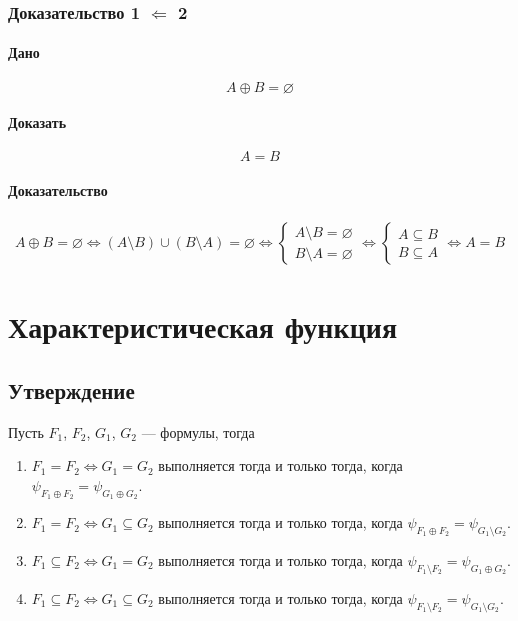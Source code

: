 \documentclass{article}
\begin{document}
\subsubsection{Доказательство 1 $\Leftarrow$ 2}
\paragraph{Дано}
\[
    A \oplus B = \varnothing
\]

\paragraph{Доказать}
\[
    A = B
\]

\paragraph{Доказательство}
\begin{gather*}
    A \oplus B = \varnothing \Leftrightarrow (A \setminus B) \cup (B \setminus A) = \varnothing \Leftrightarrow
    \begin{cases}
        A \setminus B = \varnothing \\
        B \setminus A = \varnothing
    \end{cases} \Leftrightarrow
    \begin{cases}
        A \subseteq B \\
        B \subseteq A
    \end{cases} \Leftrightarrow
    A = B
\end{gather*}



\section{Характеристическая функция}

\subsection{Утверждение}
Пусть $F_1$, $F_2$, $G_1$, $G_2$ --- формулы, тогда
\begin{enumerate}
    \item $F_1 = F_2 \Leftrightarrow G_1 = G_2$ выполняется тогда и только тогда, когда $\psi_{F_1 \oplus F_2} = \psi_{G_1 \oplus G_2}$.
    \item $F_1 = F_2 \Leftrightarrow G_1 \subseteq G_2$ выполняется тогда и только тогда, когда $\psi_{F_1 \oplus F_2} = \psi_{G_1 \setminus G_2}$.
    \item $F_1 \subseteq F_2 \Leftrightarrow G_1 = G_2$ выполняется тогда и только тогда, когда $\psi_{F_1 \setminus F_2} = \psi_{G_1 \oplus G_2}$.
    \item $F_1 \subseteq F_2 \Leftrightarrow G_1 \subseteq G_2$ выполняется тогда и только тогда, когда $\psi_{F_1 \setminus F_2} = \psi_{G_1 \setminus G_2}$.
\end{enumerate}
\end{document}
